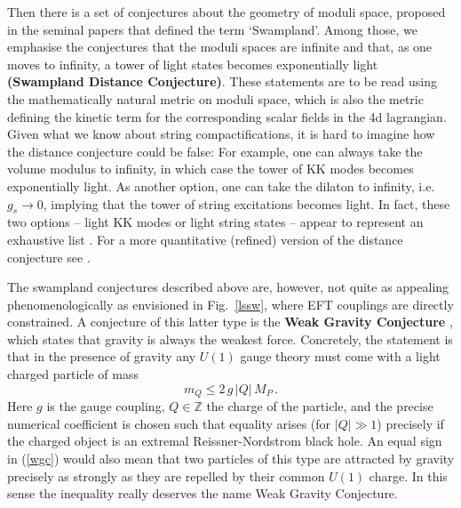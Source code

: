 \documentclass[12pt]{article}
\newcommand{\be}{\begin{equation}}
\newcommand{\ee}{\end{equation}}
\numberwithin{equation}{section}
\begin{document}
Then there is a set of conjectures about the geometry of moduli space, proposed in the seminal papers \cite{Vafa:2005ui, Ooguri:2006in} that defined the term `Swampland'. Among those, we emphasise the conjectures that the moduli spaces are infinite and that, as one moves to infinity, a tower of light states becomes exponentially light {\bf (Swampland Distance Conjecture)}. These statements are to be read using the mathematically natural metric on moduli space, which is also the metric defining the kinetic term for the corresponding scalar fields in the 4d lagrangian. Given what we know about string compactifications, it is hard to imagine how the distance  conjecture could be false: For example, one can always take the volume modulus to infinity, in which case the tower of KK modes becomes exponentially light. As another option, one can take the dilaton to infinity, i.e.~$g_s\to 0$, implying that the tower of string excitations becomes light. In fact, these two options -- light KK modes or light string states -- appear to represent an exhaustive list \cite{Lee:2019wij}. For a more quantitative (refined) version of the distance conjecture see \cite{Klaewer:2016kiy}. 

The swampland conjectures described above are, however, not quite as appealing phenomenologically as envisioned in Fig.~\ref{lssw}, where EFT couplings are directly constrained. A conjecture of this latter type is the {\bf Weak Gravity Conjecture} \cite{ArkaniHamed:2006dz}, which states that gravity is always the weakest force. Concretely, the statement is that  in the presence of gravity any $U(1)$ gauge theory must come with a light charged particle of mass
\be
m_Q \le2\,g\,|Q|\,M_P\,. \label{wgc}
\ee
Here $g$ is the gauge coupling, $Q\in \mathbb{Z}$ the charge of the particle, and the precise numerical coefficient is chosen such that equality arises  (for $|Q|\gg 1$) precisely if the charged object is an extremal Reissner-Nordstrom black hole. An equal sign in (\ref{wgc}) would also mean that two particles of this type are attracted by gravity precisely as strongly as they are repelled by their common $U(1)$ charge. In this sense the inequality really deserves the name Weak Gravity Conjecture.
\end{document}

